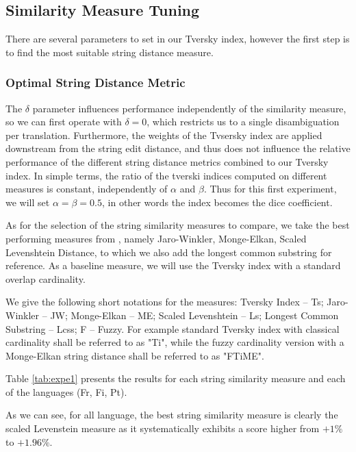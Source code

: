 \documentclass[10pt,a4paper,twoside]{article}
\begin{document}
\subsection{Similarity Measure Tuning}
There are several parameters to set in our Tversky index, however the first step is to find the most suitable string distance measure.

\subsubsection{Optimal String Distance Metric}
 The \(\delta\) parameter influences performance independently of the similarity measure, so we can first operate with \(\delta=0\), which restricts us to a single disambiguation per translation. Furthermore, the weights of the Tvsersky index are applied downstream from the string edit distance, and thus does not influence the relative performance of the different string distance metrics combined to our Tversky index. In simple terms, the ratio of the tverski indices computed on different measures is constant, independently of \(\alpha\) and \(\beta\).  Thus for this first experiment, we will set \(\alpha=\beta=0.5\), in other words the index becomes the dice coefficient.

As for the selection of the string similarity measures to compare, we take the best performing measures from \cite{Cohen2003}, namely Jaro-Winkler, Monge-Elkan, Scaled Levenshtein Distance, to which we also add the longest common substring for reference. As a baseline measure, we will use the Tversky index with a standard overlap cardinality.

We give the following short notations for the measures: Tversky Index -- Ts; Jaro-Winkler -- JW; Monge-Elkan -- ME; Scaled Levenshtein -- Ls; Longest Common Substring -- Lcss; F -- Fuzzy. For example standard Tversky index with classical cardinality shall be referred to as "Ti", while the fuzzy cardinality version with a Monge-Elkan string distance shall be referred to as "FTiME". 

Table \ref{tab:expe1} presents the results for each string similarity measure and each of the languages (Fr, Fi, Pt).

As we can see, for all language, the best string similarity measure is clearly the scaled Levenstein measure as it systematically exhibits a score higher from \(+1\%\) to \(+1.96\%\).
\end{document}

